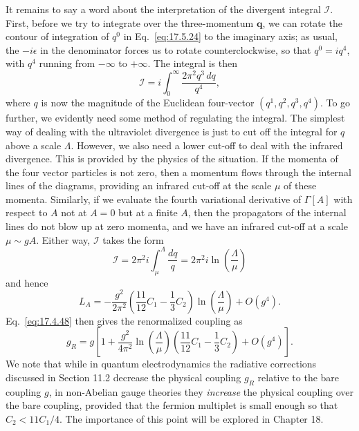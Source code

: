 It remains to say a word about the interpretation of the divergent integral
$\mathcal I$. First, before we try to integrate over the three-momentum
$\mathbf q$, we can rotate the contour of integration of $q^0$ in
Eq.~\eqref{eq:17.5.24} to the imaginary axis; as usual, the $-i\epsilon$ in
the denominator forces us to rotate counterclockwise, so that $q^0=iq^4$,
with $q^4$ running from $-\infty$ to $+\infty$. The integral is then
\begin{equation}
\mathcal I=i\int_0^\infty\frac{2\pi^2q^3\,dq}{q^4},
\label{eq:17.5.38}
\end{equation}
where $q$ is now the magnitude of the Euclidean four-vector
$(q^1,q^2,q^3,q^4)$. To go further, we evidently need some method of
regulating the integral. The simplest way of dealing with the ultraviolet
divergence is just to cut off the integral for $q$ above a scale $\Lambda$.
However, we also need a lower cut-off to deal with the infrared divergence.
This is provided by the physics of the situation. If the momenta of the four
vector particles is not zero, then a momentum flows through the internal
lines of the diagrams, providing an infrared cut-off at the scale $\mu$ of
these momenta. Similarly, if we evaluate the fourth variational derivative
of $\Gamma[A]$ with respect to $A$ not at $A=0$ but at a finite $A$, then the
propagators of the internal lines do not blow up at zero momenta, and we
have an infrared cut-off at a scale $\mu\sim gA$. Either way, $\mathcal I$
takes the form
\begin{equation}
\mathcal I=2\pi^2i\int_\mu^\Lambda\frac{dq}{q}
=2\pi^2i\ln\left(\frac{\Lambda}{\mu}\right)
\label{eq:17.5.39}
\end{equation}
and hence
\begin{equation}
L_A=-\frac{g^2}{2\pi^2}
\left(\frac{11}{12}C_1-\frac13C_2\right)
\ln\left(\frac{\Lambda}{\mu}\right)+O(g^4).
\label{eq:17.5.40}
\end{equation}
Eq.~\eqref{eq:17.4.48} then gives the renormalized coupling as
\begin{equation}
g_R=g\left[1+\frac{g^2}{4\pi^2}\ln\left(\frac{\Lambda}{\mu}\right)
\left(\frac{11}{12}C_1-\frac13C_2\right)+O(g^4)\right].
\label{eq:17.5.41}
\end{equation}
We note that while in quantum electrodynamics the radiative corrections
discussed in Section 11.2 decrease the physical coupling $g_R$ relative to
the bare coupling $g$, in non-Abelian gauge theories they \emph{increase} the
physical coupling over the bare coupling, provided that the fermion multiplet
is small enough so that $C_2<11C_1/4$. The importance of this point will be
explored in Chapter 18.

